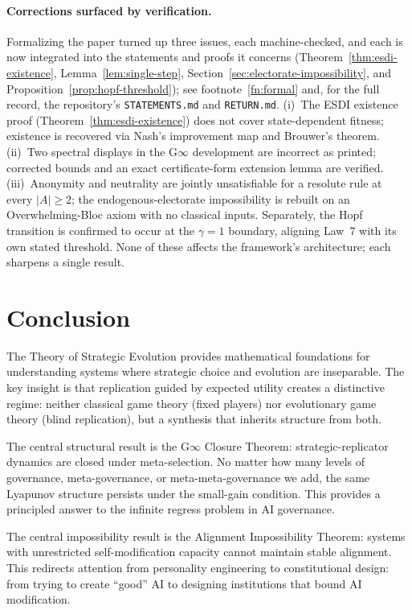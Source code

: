 \documentclass[12pt]{article}
\begin{document}
\paragraph{Corrections surfaced by verification.} Formalizing the paper turned up three issues, each machine-checked, and each is now integrated into the statements and proofs it concerns (Theorem~\ref{thm:esdi-existence}, Lemma~\ref{lem:single-step}, Section~\ref{sec:electorate-impossibility}, and Proposition~\ref{prop:hopf-threshold}); see footnote~\ref{fn:formal} and, for the full record, the repository's \texttt{STATEMENTS.md} and \texttt{RETURN.md}. (i)~The ESDI existence proof (Theorem~\ref{thm:esdi-existence}) does not cover state-dependent fitness; existence is recovered via Nash's improvement map and Brouwer's theorem. (ii)~Two spectral displays in the G$\infty$ development are incorrect as printed; corrected bounds and an exact certificate-form extension lemma are verified. (iii)~Anonymity and neutrality are jointly unsatisfiable for a resolute rule at every $|A| \geq 2$; the endogenous-electorate impossibility is rebuilt on an Overwhelming-Bloc axiom with no classical inputs. Separately, the Hopf transition is confirmed to occur at the $\gamma = 1$ boundary, aligning Law~7 with its own stated threshold. None of these affects the framework's architecture; each sharpens a single result.

\section{Conclusion}
\label{sec:conclusion}

The Theory of Strategic Evolution provides mathematical foundations for understanding systems where strategic choice and evolution are inseparable. The key insight is that replication guided by expected utility creates a distinctive regime: neither classical game theory (fixed players) nor evolutionary game theory (blind replication), but a synthesis that inherits structure from both.

The central structural result is the G$\infty$ Closure Theorem: strategic-replicator dynamics are closed under meta-selection. No matter how many levels of governance, meta-governance, or meta-meta-governance we add, the same Lyapunov structure persists under the small-gain condition. This provides a principled answer to the infinite regress problem in AI governance.

The central impossibility result is the Alignment Impossibility Theorem: systems with unrestricted self-modification capacity cannot maintain stable alignment. This redirects attention from personality engineering to constitutional design: from trying to create ``good'' AI to designing institutions that bound AI modification.
\end{document}
